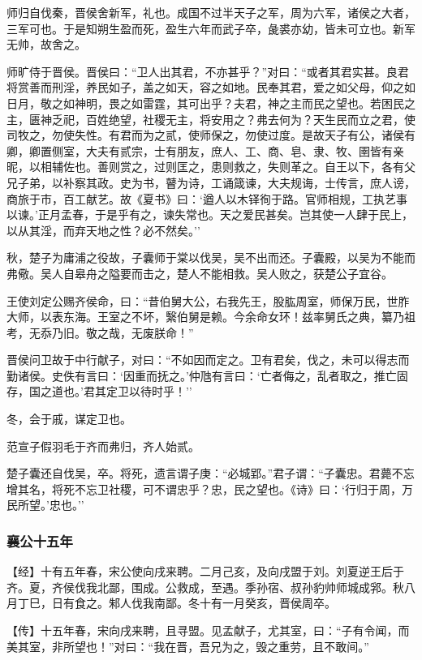 \documentclass[]{article}
\begin{document}
师归自伐秦，晋侯舍新军，礼也。成国不过半天子之军，周为六军，诸侯之大者，三军可也。于是知朔生盈而死，盈生六年而武子卒，彘裘亦幼，皆未可立也。新军无帅，故舍之。

师旷侍于晋侯。晋侯曰：``卫人出其君，不亦甚乎？''对曰：``或者其君实甚。良君将赏善而刑淫，养民如子，盖之如天，容之如地。民奉其君，爱之如父母，仰之如日月，敬之如神明，畏之如雷霆，其可出乎？夫君，神之主而民之望也。若困民之主，匮神乏祀，百姓绝望，社稷无主，将安用之？弗去何为？天生民而立之君，使司牧之，勿使失性。有君而为之贰，使师保之，勿使过度。是故天子有公，诸侯有卿，卿置侧室，大夫有贰宗，士有朋友，庶人、工、商、皂、隶、牧、圉皆有亲昵，以相辅佐也。善则赏之，过则匡之，患则救之，失则革之。自王以下，各有父兄子弟，以补察其政。史为书，瞽为诗，工诵箴谏，大夫规诲，士传言，庶人谤，商旅于市，百工献艺。故《夏书》曰：`遒人以木铎徇于路。官师相规，工执艺事以谏。'正月孟春，于是乎有之，谏失常也。天之爱民甚矣。岂其使一人肆于民上，以从其淫，而弃天地之性？必不然矣。''

秋，楚子为庸浦之役故，子囊师于棠以伐吴，吴不出而还。子囊殿，以吴为不能而弗儆。吴人自皋舟之隘要而击之，楚人不能相救。吴人败之，获楚公子宜谷。

王使刘定公赐齐侯命，曰：``昔伯舅大公，右我先王，股肱周室，师保万民，世胙大师，以表东海。王室之不坏，繄伯舅是赖。今余命女环！兹率舅氏之典，纂乃祖考，无忝乃旧。敬之哉，无废朕命！''

晋侯问卫故于中行献子，对曰：``不如因而定之。卫有君矣，伐之，未可以得志而勤诸侯。史佚有言曰：`因重而抚之。'仲虺有言曰：`亡者侮之，乱者取之，推亡固存，国之道也。'君其定卫以待时乎！''

冬，会于戚，谋定卫也。

范宣子假羽毛于齐而弗归，齐人始贰。

楚子囊还自伐吴，卒。将死，遗言谓子庚：``必城郢。''君子谓：``子囊忠。君薨不忘增其名，将死不忘卫社稷，可不谓忠乎？忠，民之望也。《诗》曰：`行归于周，万民所望。'忠也。''

\hypertarget{header-n2015}{%
\subsubsection{襄公十五年}\label{header-n2015}}

【经】十有五年春，宋公使向戌来聘。二月己亥，及向戌盟于刘。刘夏逆王后于齐。夏，齐侯伐我北鄙，围成。公救成，至遇。季孙宿、叔孙豹帅师城成郛。秋八月丁巳，日有食之。邾人伐我南鄙。冬十有一月癸亥，晋侯周卒。

【传】十五年春，宋向戌来聘，且寻盟。见孟献子，尤其室，曰：``子有令闻，而美其室，非所望也！''对曰：``我在晋，吾兄为之，毁之重劳，且不敢间。''
\end{document}
